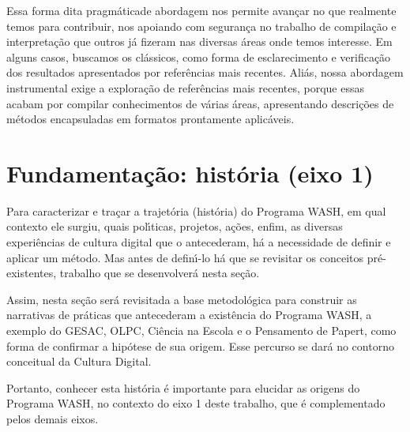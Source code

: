 \documentclass[
12pt,		%
openright,	%
twoside,  %
a4paper,			%
chapter=TITLE,		%
english,			%
french,				%
spanish,			%
brazil				%
]{USPSC-classe/USPSC}
\begin{document}
Essa forma dita \textquotedbl pragm\'atica\textquotedbl  de abordagem nos permite avan\c{c}ar no que realmente temos para contribuir, nos apoiando com seguran\c{c}a no trabalho de compila\c{c}\~ao e interpreta\c{c}\~ao que outros j\'a fizeram nas diversas \'areas onde temos interesse. Em alguns casos, buscamos os cl\'assicos, como forma de esclarecimento e verifica\c{c}\~ao dos resultados apresentados por refer\^encias mais recentes. Ali\'as, nossa abordagem instrumental exige a explora\c{c}\~ao de refer\^encias mais recentes, porque essas acabam por compilar conhecimentos de v\'arias \'areas, apresentando descri\c{c}\~oes de m\'etodos encapsuladas em formatos prontamente aplic\'aveis.









\section[Fundamenta\c{c}\~ao: hist\'oria (eixo 1)]{Fundamenta\c{c}\~ao: hist\'oria (eixo 1)}\label{Fundamenta\c{c}\~ao: hist\'oria (eixo 1)}
Para caracterizar e tra\c{c}ar a trajet\'oria (hist\'oria) do Programa WASH, em qual contexto ele surgiu, quais pol\'{\i}ticas, projetos, a\c{c}\~oes, enfim, as diversas experi\^encias de cultura digital que o antecederam, h\'a a necessidade de definir e aplicar um m\'etodo. Mas antes de defin\'{\i}-lo h\'a que se revisitar os conceitos pr\'e-existentes, trabalho que se desenvolver\'a nesta se\c{c}\~ao.









Assim, nesta se\c{c}\~ao ser\'a revisitada a base metodol\'ogica para construir as narrativas de pr\'aticas  que antecederam a exist\^encia do Programa WASH, a exemplo do GESAC, OLPC, Ci\^encia na Escola e o Pensamento de Papert, como forma de confirmar a hip\'otese de sua origem. Esse percurso se dar\'a no contorno conceitual da Cultura Digital.









Portanto, conhecer esta hist\'oria \'e importante para elucidar as origens do Programa WASH, no contexto do eixo 1 deste trabalho, que \'e complementado pelos demais eixos.
\end{document}
